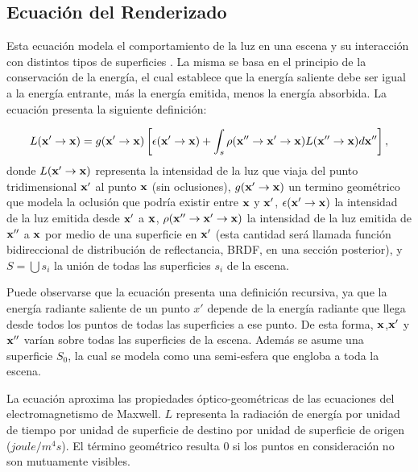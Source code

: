 \subsection{Ecuación del Renderizado}

Esta ecuación modela el comportamiento de la luz en una escena y su interacción con distintos tipos de superficies \cite{Kajiya1986}.
La misma se basa en el principio de la conservación de la energía, el cual establece que la energía saliente debe ser igual a la energía entrante, más la energía emitida, menos la energía absorbida.
La ecuación presenta la siguiente definición:

\begin{equation}
L(\bold{x'} \rightarrow \bold{x}) =  g(\bold{x'}  \rightarrow \bold{x})  \left[ \epsilon(\bold{x'}  \rightarrow \bold{x}) + \int_{s}{\rho(\bold{x''}  \rightarrow \bold{x'}  \rightarrow \bold{x})L(\bold{x''}  \rightarrow \bold{x}) d\bold{x''}} \right],
\end{equation}
donde $L(\bold{x'} \rightarrow \bold{x})$ representa la intensidad de la luz que viaja del punto tridimensional $\bold{x'}$ al punto $\bold{x}$ (sin oclusiones), $g(\bold{x'} \rightarrow \bold{x})$ un termino geométrico que modela la oclusión que podría existir entre $\bold{x}$ y $\bold{x'}$, $\epsilon(\bold{x'} \rightarrow \bold{x})$ la intensidad de la luz emitida desde $\bold{x'}$ a $\bold{x}$, $\rho(\bold{x''}  \rightarrow \bold{x'}  \rightarrow \bold{x})$ la intensidad de la luz emitida de $\bold{x''}$ a $\bold{x}$ por medio de una superficie en $\bold{x'}$ (esta cantidad será llamada función bidireccional de distribución de reflectancia, \acrshort{BRDF}, en una sección posterior), y $S=\bigcup{s_{i}}$ la unión de todas las superficies $s_{i}$ de la escena.


Puede observarse que la ecuación presenta una definición recursiva, ya que la energía radiante saliente de un punto $x'$ depende de la energía radiante que llega desde todos los puntos de todas las superficies a ese punto.
De esta forma, $\bold{x}$,$\bold{x'}$ y $\bold{x''}$ varían sobre todas las superficies de la escena.
Además se asume una superficie $S_{0}$, la cual se modela como una semi-esfera que engloba a toda la escena.

La ecuación aproxima las propiedades óptico-geométricas de las ecuaciones del electromagnetismo de Maxwell.
$L$ representa la radiación de energía por unidad de tiempo por unidad de superficie de destino por unidad de superficie de origen ($joule/m^{4} s$).
El término geométrico resulta $0$ si los puntos en consideración no son mutuamente visibles.

